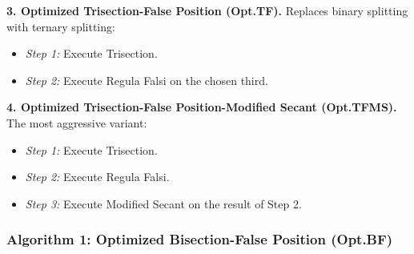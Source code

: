 \documentclass[amsmath, amssymb, aps]{revtex4-2}
\begin{document}
\textbf{3. Optimized Trisection-False Position (Opt.TF).}
Replaces binary splitting with ternary splitting:
\begin{itemize}
    \item \textit{Step 1:} Execute Trisection.
    \item \textit{Step 2:} Execute Regula Falsi on the chosen third.
\end{itemize}

\textbf{4. Optimized Trisection-False Position-Modified Secant (Opt.TFMS).}
The most aggressive variant:
\begin{itemize}
    \item \textit{Step 1:} Execute Trisection.
    \item \textit{Step 2:} Execute Regula Falsi.
    \item \textit{Step 3:} Execute Modified Secant on the result of Step 2.
\end{itemize}

\subsubsection{Algorithm 1: Optimized Bisection-False Position (Opt.BF)}
\end{document}
